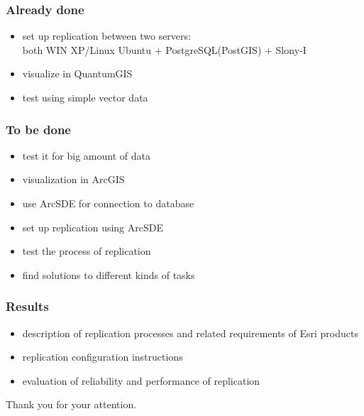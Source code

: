 \documentclass[xcolor=dvipsnames, 14pt]{beamer}
\begin{document}
  \begin{frame}
    \frametitle{Already done}
    \begin{itemize}
      \item set up replication between two servers: 
        \\ both WIN XP/Linux Ubuntu + PostgreSQL(PostGIS) + Slony-I
      \item visualize in QuantumGIS
      \item test using simple vector data 
    \end{itemize}
  \end{frame}

  \begin{frame}
    \frametitle{To be done}
    \begin{itemize}
      \item test it for big amount of data
      \item visualization in ArcGIS
      \item use ArcSDE for connection to database
      \item set up replication using ArcSDE
      \item test the process of replication
      \item find solutions to different kinds of tasks
    \end{itemize}
  \end{frame}

  \begin{frame}
    \frametitle{Results}
    \begin{itemize}
      \item description of replication processes and related requirements of Esri products
      \item replication configuration instructions
      \item evaluation of reliability and performance of replication 
    \end{itemize}
  \end{frame}
  
  \begin{frame}
    \begin{center}
      {\Large\color{GisLightBlue}Thank you for your attention.}
    \end{center}
  \end{frame}
\end{document}
